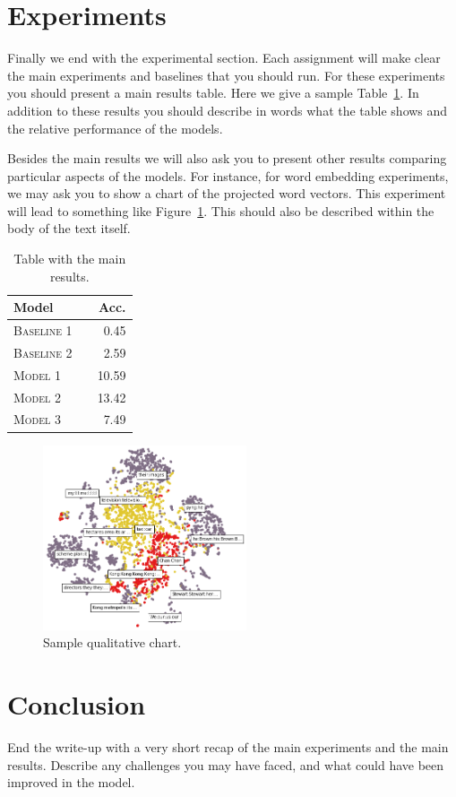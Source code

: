 \documentclass[11pt]{article}
\begin{document}
\section{Experiments}

Finally we end with the experimental section. Each assignment will make clear the main experiments and baselines that you should run. For these experiments you should present a main results table. Here we give a sample Table~\ref{tab:results}. In addition to these results you should describe in words what the table shows and the relative performance of the models.

Besides the main results we will also ask you to present other results
comparing particular aspects of the models. For instance, for word
embedding experiments, we may ask you to show a chart of the projected
word vectors. This experiment will lead to something like
Figure~\ref{fig:clusters}. This should also be described within the
body of the text itself.


\begin{table}[h]
\centering
\begin{tabular}{llr}
 \toprule
 Model &  & Acc. \\
 \midrule
 \textsc{Baseline 1} & & 0.45\\
 \textsc{Baseline 2} & & 2.59 \\
 \textsc{Model 1} & & 10.59  \\
 \textsc{Model 2} & &13.42 \\
 \textsc{Model 3} & & 7.49\\
 \bottomrule
\end{tabular}
\caption{\label{tab:results} Table with the main results.}
\end{table}


\begin{figure}
  \centering
  \includegraphics[width=6cm]{cluster_viz}
  \caption{\label{fig:clusters} Sample qualitative chart.}
\end{figure}


\section{Conclusion}

End the write-up with a very short recap of the main experiments and the main results. Describe any challenges you may have faced, and what could have been improved in the model.



\end{document}

